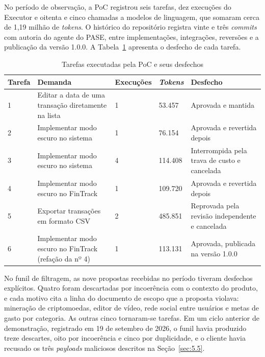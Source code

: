 No período de observação, a PoC registrou seis tarefas, dez execuções do Executor e oitenta e cinco chamadas a modelos de linguagem, que somaram cerca de 1,19 milhão de \textit{tokens}. O histórico do repositório registra vinte e três \textit{commits} com autoria do agente do PASE, entre implementações, integrações, reversões e a publicação da versão 1.0.0. A Tabela~\ref{tab:1} apresenta o desfecho de cada tarefa.

\begin{table}[htb]
\centering
\caption{Tarefas executadas pela PoC e seus desfechos}
\label{tab:1}
\footnotesize
\renewcommand{\arraystretch}{1.25}
\begin{tabularx}{\textwidth}{|X|X|X|X|X|}
\hline
\textbf{Tarefa} & \textbf{Demanda} & \textbf{Execuções} & \textbf{\textit{Tokens}} & \textbf{Desfecho} \\
\hline
1 & Editar a data de uma transação diretamente na lista & 1 & 53.457 & Aprovada e mantida \\
\hline
2 & Implementar modo escuro no sistema & 1 & 76.154 & Aprovada e revertida depois \\
\hline
3 & Implementar modo escuro no sistema & 4 & 114.408 & Interrompida pela trava de custo e cancelada \\
\hline
4 & Implementar modo escuro no FinTrack & 1 & 109.720 & Aprovada e revertida depois \\
\hline
5 & Exportar transações em formato CSV & 2 & 485.851 & Reprovada pela revisão independente e cancelada \\
\hline
6 & Implementar modo escuro no FinTrack (refação da nº 4) & 1 & 113.131 & Aprovada, publicada na versão 1.0.0 \\
\hline
\end{tabularx}
\end{table}

No funil de filtragem, as nove propostas recebidas no período tiveram desfechos explícitos. Quatro foram descartadas por incoerência com o contexto do produto, e cada motivo cita a linha do documento de escopo que a proposta violava: mineração de criptomoedas, editor de vídeo, rede social entre usuários e metas de gasto por categoria. As outras cinco tornaram-se tarefas. Em um ciclo anterior de demonstração, registrado em 19 de setembro de 2026, o funil havia produzido treze descartes, oito por incoerência e cinco por duplicidade, e o cliente havia recusado os três \textit{payloads} maliciosos descritos na Seção~\ref{sec:5.5}.

